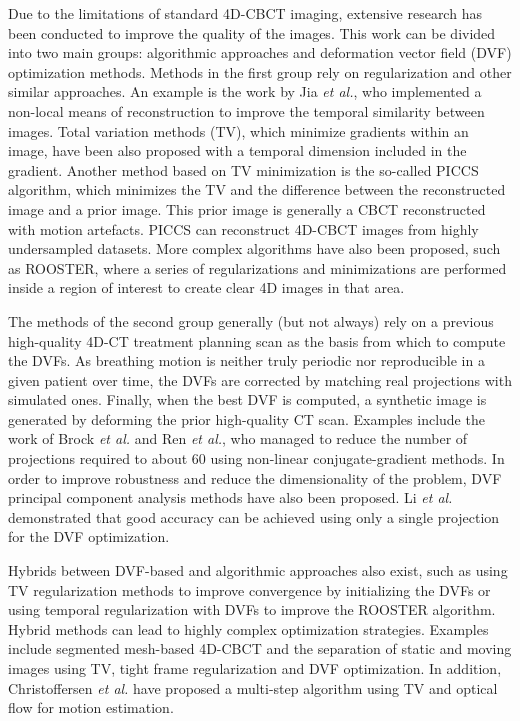 Due to the limitations of standard 4D-CBCT imaging, extensive research has been conducted to improve the quality of the images.  This work can be divided into two main groups: algorithmic approaches and deformation vector field (DVF) optimization methods.  Methods in the first group rely on regularization and other similar approaches.  An example is the work by Jia \textit{et al.}\cite{jia2012}, who implemented a non-local means of reconstruction to improve the temporal similarity between images.  Total variation methods (TV)\cite{ASD_POCS}, which minimize gradients within an image, have been also proposed with a temporal dimension included in the gradient\cite{0031-9155-57-6-1517}.  Another method based on TV minimization is the so-called PICCS algorithm\cite{chen2008prior}\cite{0031-9155-53-20-006}\cite{chen2012time}, which minimizes the TV and the difference between the reconstructed image and a prior image.  This prior image is generally a CBCT reconstructed with motion artefacts.  PICCS can reconstruct 4D-CBCT images from highly undersampled datasets.  More complex algorithms have also been proposed, such as ROOSTER\cite{:/content/aapm/journal/medphys/41/2/10.1118/1.4860215}, where a series of regularizations and minimizations are performed inside a region of interest to create clear 4D images in that area.

The methods of the second group generally (but not always) rely on a previous high-quality 4D-CT treatment planning scan as the basis from which to compute the DVFs.  As breathing motion is neither truly periodic nor reproducible in a given patient over time, the DVFs are corrected by matching real projections with simulated ones.  Finally, when the best DVF is computed, a synthetic image is generated by deforming the prior high-quality CT scan.  Examples include the work of Brock \textit{et al.}\cite{brock2010} and Ren \textit{et al.}\cite{Ren20121584}, who managed to reduce the number of projections required to about 60 using non-linear conjugate-gradient methods.  In order to improve robustness and reduce the dimensionality of the problem, DVF principal component analysis methods have also been proposed\cite{zhang2010correction}.  Li \textit{et al.}\cite{:/content/aapm/journal/medphys/37/6/10.1118/1.3426002}\cite{:/content/aapm/journal/medphys/38/5/10.1118/1.3582693} demonstrated that good accuracy can be achieved using only a single projection for the DVF optimization.

Hybrids between DVF-based and algorithmic approaches also exist, such as using TV regularization methods to improve convergence by initializing the DVFs\cite{wang2012high} or using temporal regularization with DVFs to improve the ROOSTER algorithm\cite{mory2016motion}.  Hybrid methods can lead to highly complex optimization strategies.  Examples include segmented mesh-based 4D-CBCT\cite{0031-9155-61-3-996} and the separation of static and moving images using TV, tight frame regularization and DVF optimization\cite{0031-9155-56-11-002}.  In addition, Christoffersen \textit{et al.}\cite{christoffersen2013registration} have proposed a multi-step algorithm using TV and optical flow for motion estimation.

